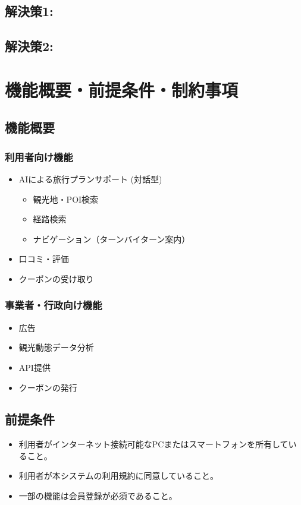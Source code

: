 \documentclass{docs}
\begin{document}
\subsection{解決策1: }

\subsection{解決策2: }

\section{機能概要・前提条件・制約事項}

\subsection{機能概要}
\subsubsection{利用者向け機能}
\begin{itemize}
	\item AIによる旅行プランサポート (対話型)
\begin{itemize}
	\item 観光地・POI検索
	\item 経路検索
	\item ナビゲーション（ターンバイターン案内）
\end{itemize}
	\item 口コミ・評価
	\item クーポンの受け取り
\end{itemize}

\subsubsection{事業者・行政向け機能}
\begin{itemize}
	\item 広告
	\item 観光動態データ分析
	\item API提供
	\item クーポンの発行
\end{itemize}

\subsection{前提条件}
\begin{itemize}
	\item 利用者がインターネット接続可能なPCまたはスマートフォンを所有していること。
	\item 利用者が本システムの利用規約に同意していること。
	\item 一部の機能は会員登録が必須であること。
\end{itemize}
\end{document}
